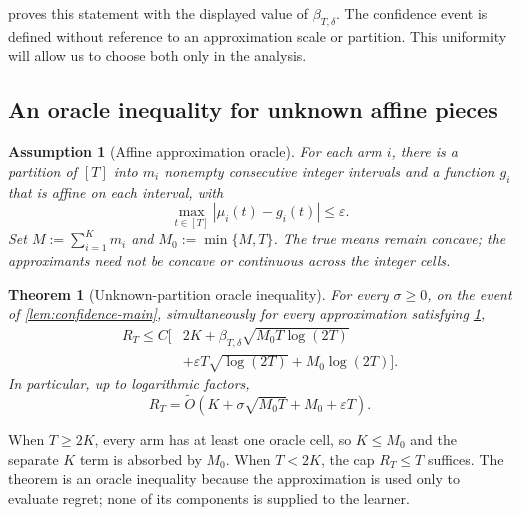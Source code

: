 \documentclass[11pt]{article}
\newtheorem{theorem}{Theorem}[section]
\newtheorem{assumption}[assumption]{Assumption}
\theoremstyle{remark}
\begin{document}
 proves this statement with the displayed value of $\beta_{T,\delta}$. The confidence event is defined without reference to an approximation scale or partition. This uniformity will allow us to choose both only in the analysis.

\subsection{An oracle inequality for unknown affine pieces}

\begin{samepage}
\begin{assumption}[Affine approximation oracle]\label{ass:oracle-main}
For each arm $i$, there is a partition of $[T]$ into $m_i$ nonempty consecutive integer intervals and a function $g_i$ that is affine on each interval, with
\[
\max_{t\in[T]}|\mu_i(t)-g_i(t)|\le\varepsilon.
\]
Set $M:=\sum_{i=1}^K m_i$ and $M_0:=\min\{M,T\}$. The true means remain concave; the approximants need not be concave or continuous across the integer cells.
\end{assumption}
\end{samepage}

\begin{samepage}
\begin{theorem}[Unknown-partition oracle inequality]\label{thm:oracle-main}
For every $\sigma\ge0$, on the event of \cref{lem:confidence-main}, simultaneously for every approximation satisfying \cref{ass:oracle-main},
\begin{equation}\label{eq:oracle-main}
\begin{split}
R_T\le C\bigl[&2K+\beta_{T,\delta}\sqrt{M_0T\log(2T)}\\
&+\varepsilon T\sqrt{\log(2T)}+M_0\log(2T)\bigr].
\end{split}
\end{equation}
In particular, up to logarithmic factors,
\[
R_T=\widetilde O\!\left(K+\sigma\sqrt{M_0T}+M_0+\varepsilon T\right).
\]
\end{theorem}
\end{samepage}

When $T\ge2K$, every arm has at least one oracle cell, so $K\le M_0$ and the separate $K$ term is absorbed by $M_0$. When $T<2K$, the cap $R_T\le T$ suffices. The theorem is an oracle inequality because the approximation is used only to evaluate regret; none of its components is supplied to the learner.
\end{document}
